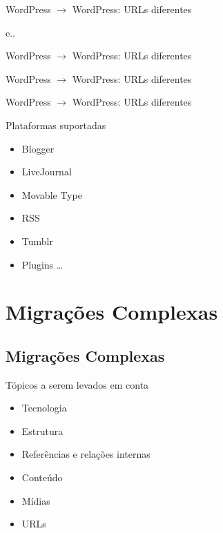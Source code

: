 \documentclass[handout]{beamer}
\begin{document}
\begin{frame}[fragile]{WordPress $\rightarrow$ WordPress: URLs diferentes}
  
  e..
\end{frame}

\begin{frame}[fragile]{WordPress $\rightarrow$ WordPress: URLs diferentes}
  
  \pause
  
  \pause
  
  \pause
  
\end{frame}

\begin{frame}[fragile]{WordPress $\rightarrow$ WordPress: URLs diferentes}
  
  \pause
  
\end{frame}

\begin{frame}[fragile]{WordPress $\rightarrow$ WordPress: URLs diferentes}
  
\end{frame}

\begin{frame}{Plataformas suportadas}
\begin{itemize}
  \pause
  \item Blogger
  \item LiveJournal
  \item Movable Type
  \item RSS
  \item Tumblr
  \item Plugins \ldots
\end{itemize}
\end{frame}

\section{Migrações Complexas}
\subsection{Migrações Complexas}

\begin{frame}{Tópicos a serem levados em conta}
  \begin{itemize}
    \pause \item Tecnologia
    \pause \item Estrutura
    \pause \item Referências e relações internas
    \pause \item Conteúdo
    \pause \item Mídias
    \pause \item URLs
  \end{itemize}
\end{frame}
\end{document}
